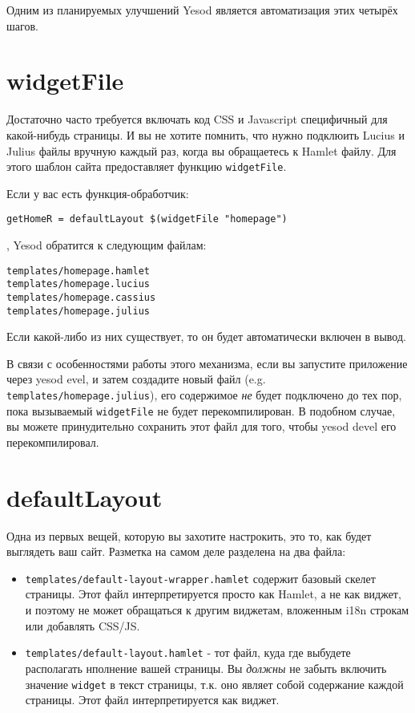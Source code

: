 \begin{remark}
  Одним из планируемых улучшений Yesod является автоматизация этих четырёх шагов.
\end{remark}

\section{widgetFile}

Достаточно часто требуется включать код CSS и Javascript специфичный для какой-нибудь страницы.
И вы не хотите помнить, что нужно подклюить Lucius и Julius файлы вручную каждый раз,
когда вы обращаетесь к Hamlet файлу. Для этого шаблон сайта предоставляет 
функцию \lstinline!widgetFile!.

Если у вас есть функция-обработчик:

\begin{lstlisting}
getHomeR = defaultLayout $(widgetFile "homepage")
\end{lstlisting}%

, Yesod обратится к следующим файлам:

\begin{lstlisting}
templates/homepage.hamlet
templates/homepage.lucius
templates/homepage.cassius
templates/homepage.julius
\end{lstlisting}

Если какой-либо из них существует, то он будет автоматически включен в вывод.

\begin{remark}
  В связи с особенностями работы этого механизма, если вы запустите приложение через
  yesod evel, и затем создадите новый файл (e.g. \lstinline!templates/homepage.julius!),
  его содержимое \emph{не} будет подключено до тех пор, пока вызываемый \lstinline!widgetFile!
  не будет перекомпилирован.  В подобном случае, вы можете принудительно сохранить
  этот файл для того, чтобы yesod devel его перекомпилировал.
\end{remark}

\section{defaultLayout}

Одна из первых вещей, которую вы захотите настрокить, это то, как будет выглядеть ваш сайт.
Разметка на самом деле разделена на два файла:
\begin{itemize}
  \item \lstinline!templates/default-layout-wrapper.hamlet! содержит базовый скелет
    страницы. Этот файл интерпретируется просто как Hamlet, а не как виджет, и поэтому
    не может обращаться к другим виджетам, вложенным i18n строкам или добавлять CSS/JS.
  \item \lstinline!templates/default-layout.hamlet! - тот файл, куда где выбудете располагать
    нполнение вашей страницы. Вы \emph{должны} не забыть включить значение \lstinline!widget!
    в текст страницы, т.к. оно являет собой содержание каждой страницы. Этот файл
    интерпретируется как виджет.
\end{itemize}

